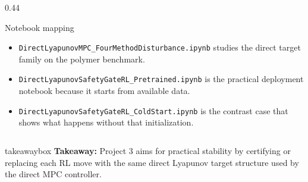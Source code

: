 \documentclass[aspectratio=169]{beamer}
\newcommand{\takeawaybox}[1]{%
\vspace{0.01cm}
\begin{center}
\begin{beamercolorbox}[wd=0.94\textwidth,sep=3pt,center,rounded=true,shadow=false]{takeawaybox}
\scriptsize
\textbf{\textcolor{maroon1}{Takeaway:}} #1
\end{beamercolorbox}
\end{center}
}
\begin{document}
\begin{frame}
\begin{columns}[T,onlytextwidth]
\begin{column}{0.44\textwidth}
\vspace{0.02cm}

\begin{block}{Notebook mapping}
\begin{itemize}\justifying
  \setlength{\itemsep}{0.28ex}
  \item \texttt{DirectLyapunovMPC\_FourMethodDisturbance.ipynb} studies the direct target family on the polymer benchmark.
  \item \texttt{DirectLyapunovSafetyGateRL\_Pretrained.ipynb} is the practical deployment notebook because it starts from available data.
  \item \texttt{DirectLyapunovSafetyGateRL\_ColdStart.ipynb} is the contrast case that shows what happens without that initialization.
\end{itemize}
\end{block}
\end{column}

\end{columns}

\takeawaybox{Project 3 aims for practical stability by certifying or replacing each RL move with the same direct Lyapunov target structure used by the direct MPC controller.}

\end{frame}
\end{document}

